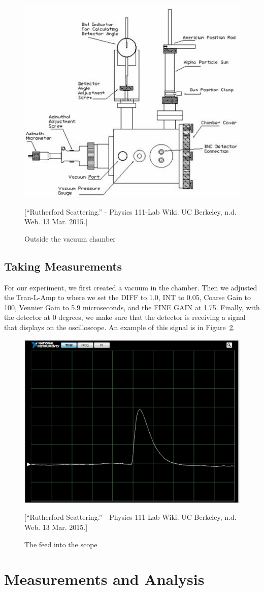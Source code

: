 \begin{figure}[h]
  \includegraphics[width = 5 cm]{Diagram2.jpg}
  \begin{center}
  \caption{Outside the vacuum chamber}[\footnotesize{``Rutherford Scattering.'' - Physics 111-Lab Wiki. UC Berkeley, n.d. Web. 13 Mar. 2015.}]
  \label{OutisdeDiagram}
  \end{center}
\end{figure}

\subsection{Taking Measurements}

For our experiment, we first created a vacuum in the chamber. Then we adjusted the Tran-L-Amp to where we set the DIFF to 1.0, INT to 0.05, Coarse Gain to 100, Vennier Gain to  5.9 microseconds, and the FINE GAIN at 1.75. Finally, with the detector at 0 degrees, we make sure that the detector is receiving a signal that displays on the oscilloscope. An example of this signal is in Figure~\ref{Scope}.

\begin{figure}[h]
  \includegraphics[width = 5 cm]{Scope.png}
  \begin{center}
  \caption{The feed into the scope}[\footnotesize{``Rutherford Scattering.'' - Physics 111-Lab Wiki. UC Berkeley, n.d. Web. 13 Mar. 2015.}]
  \label{Scope}
  \end{center}
\end{figure}

\section{Measurements and Analysis}


